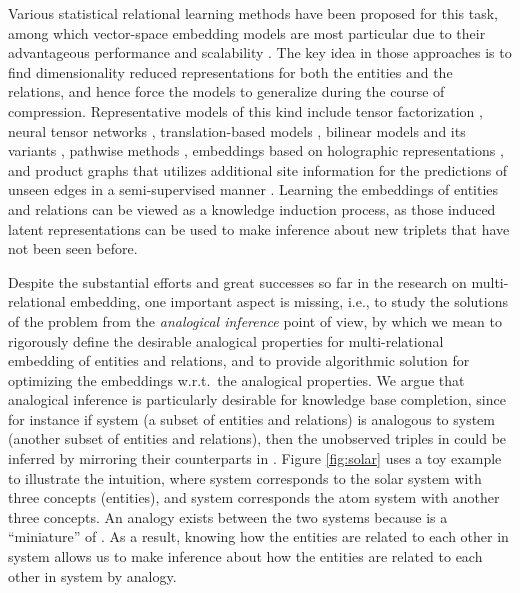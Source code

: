 \documentclass{article}
\begin{document}
Various statistical relational learning methods \cite{getoor2007introduction, nickel2015review}
have been proposed for this task,
among which vector-space embedding models are most particular due to their advantageous performance and scalability \cite{bordes2013translating}. The key idea in those approaches
is to find dimensionality reduced representations for both the entities and the relations, and hence 
force the models to generalize during the course of compression.
Representative models of this kind include tensor factorization
\cite{singhal2012introducing, nickel2011three},
neural tensor networks \cite{socher2013reasoning, chen2013learning},
translation-based models \cite{bordes2013translating, wang2014knowledge, lin2015learning},
bilinear models and its variants \cite{DBLP:journals/corr/YangYHGD14a, DBLP:conf/icml/TrouillonWRGB16},
pathwise methods \cite{guu2015traversing}, embeddings based on holographic representations \cite{DBLP:conf/aaai/NickelRP16}, and product graphs that utilizes additional site information for the predictions of unseen edges in a semi-supervised manner \cite{liu2015bipartite,liu2016cross}.
Learning the embeddings of entities and relations can be viewed as a knowledge induction process, as those induced latent representations can be used to make inference about new triplets that have not been seen before.

Despite the substantial efforts and great successes so far in the research on multi-relational embedding, one important aspect is missing, i.e., to study the solutions of the problem from the \textit{analogical inference} point of view, by which we mean to rigorously define the desirable analogical properties for multi-relational embedding of entities and relations, and to provide algorithmic solution for optimizing the embeddings w.r.t.\ the analogical properties.
We argue that analogical inference is particularly 
desirable for knowledge base completion,
since for instance if system  (a subset of entities and relations) is analogous to system  (another subset of entities and relations),
then the unobserved triples in  could be inferred by mirroring their counterparts in . Figure \ref{fig:solar} uses a toy example to illustrate the intuition, where system  corresponds to the solar system with three concepts (entities), and system  corresponds the atom system with another three concepts. An analogy exists between the two systems because  is a ``miniature'' of . As a result, knowing how the entities are related to each other in system  allows us to make inference about how the entities are related to each other in system  by analogy.
\end{document}
